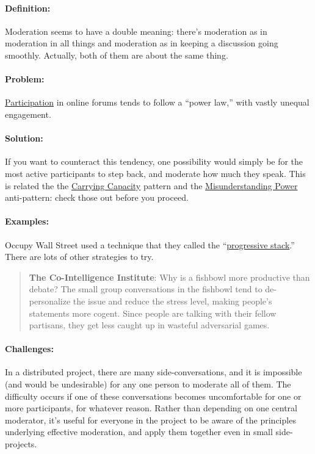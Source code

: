 \paragraph{Definition:} Moderation seems to have a double meaning: there's
moderation as in moderation in all things and moderation as in keeping a
discussion going smoothly. Actually, both of them are about the same
thing.

\paragraph{Problem:}
\href{http://peeragogy.org/organizing-a-learning-context/participation/}{Participation}
in online forums tends to follow a ``power law,'' with vastly unequal
engagement.

\paragraph{Solution:} If you want to counteract this tendency, one
possibility would simply be for the most active participants to step
back, and moderate how much they speak. This is related the the
\href{http://peeragogy.org/patterns-usecases/patterns-and-heuristics/carrying-capacity/}{Carrying
Capacity} pattern and the
\href{http://peeragogy.org/practice/antipatterns/misunderstanding-power/}{Misunderstanding
Power} anti-pattern: check those out before you proceed.

\paragraph{Examples:} Occupy Wall Street used a technique that they called
the ``\href{http://en.wikipedia.org/wiki/Progressive_stack}{progressive
stack}.'' There are lots of other strategies to try.

\begin{quote}
\textbf{The Co-Intelligence Institute}: Why is a fishbowl more
productive than debate? The small group conversations in the fishbowl
tend to de-personalize the issue and reduce the stress level, making
people's statements more cogent. Since people are talking with their
fellow partisans, they get less caught up in wasteful adversarial games.
\end{quote}

\paragraph{Challenges:} In a distributed project, there are many
side-conversations, and it is impossible (and would be undesirable) for
any one person to moderate all of them. The difficulty occurs if one of
these conversations becomes uncomfortable for one or more participants,
for whatever reason. Rather than depending on one central moderator,
it's useful for everyone in the project to be aware of the principles
underlying effective moderation, and apply them together even in small
side-projects.

